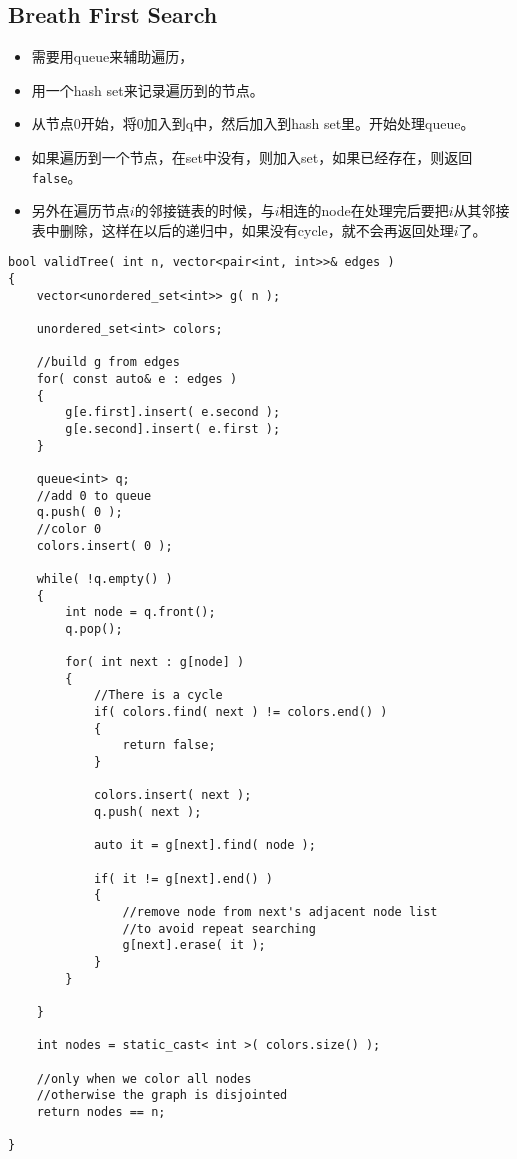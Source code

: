 \subsection{Breath First Search}
\begin{itemize}
\item 需要用queue来辅助遍历，
\item 用一个hash set来记录遍历到的节点。
\item 从节点0开始，将0加入到q中，然后加入到hash set里。开始处理queue。
\item 如果遍历到一个节点，在set中没有，则加入set，如果已经存在，则返回\texttt{false}。
\item 另外在遍历节点$i$的邻接链表的时候，与$i$相连的node在处理完后要把$i$从其邻接表中删除，这样在以后的递归中，如果没有cycle，就不会再返回处理$i$了。
\end{itemize}
\begin{lstlisting}[style=customc, caption={BFS}]
bool validTree( int n, vector<pair<int, int>>& edges )
{
    vector<unordered_set<int>> g( n );

    unordered_set<int> colors;

    //build g from edges
    for( const auto& e : edges )
    {
        g[e.first].insert( e.second );
        g[e.second].insert( e.first );
    }

    queue<int> q;
    //add 0 to queue
    q.push( 0 );
    //color 0
    colors.insert( 0 );

    while( !q.empty() )
    {
        int node = q.front();
        q.pop();

        for( int next : g[node] )
        {
            //There is a cycle
            if( colors.find( next ) != colors.end() )
            {
                return false;
            }

            colors.insert( next );
            q.push( next );

            auto it = g[next].find( node );

            if( it != g[next].end() )
            {
                //remove node from next's adjacent node list
                //to avoid repeat searching
                g[next].erase( it );
            }
        }

    }

    int nodes = static_cast< int >( colors.size() );

    //only when we color all nodes
    //otherwise the graph is disjointed
    return nodes == n;

}
\end{lstlisting}
